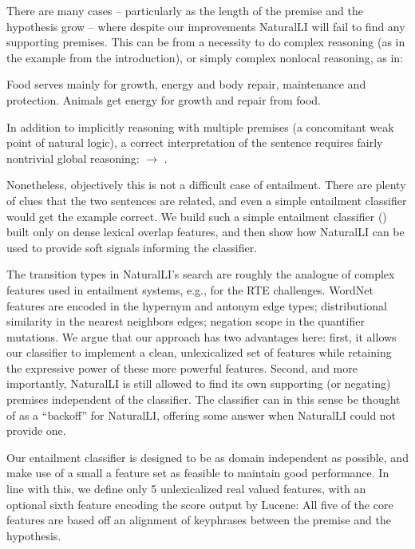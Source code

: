There are many cases -- particularly as the length of the premise and the hypothesis grow --
  where despite our improvements NaturalLI will fail to find any supporting
  premises.
This can be from a necessity to do complex reasoning (as in the example from the 
  introduction), or simply complex nonlocal reasoning, as in:

\entailmentExample
{Food serves mainly for growth, energy and body repair, maintenance and protection.}
{Animals get energy for growth and repair from food.}

In addition to implicitly reasoning with multiple premises (a concomitant weak
  point of natural logic), a correct interpretation of the sentence requires
  fairly nontrivial global reasoning: 
  $\rightarrow$ .

Nonetheless, objectively this is not a difficult case of entailment.
There are plenty of clues that the two sentences are related, and even a simple
  entailment classifier would get the example correct.
We build such a simple entailment classifier () built only
  on dense lexical overlap features, and
  then show how NaturalLI can be used to provide soft signals informing the classifier.

The transition types in NaturalLI's search are roughly the analogue of complex features
  used in entailment systems, e.g., for the RTE challenges.
WordNet features are encoded in the hypernym and antonym edge types; distributional
  similarity in the nearest neighbors edges; negation scope in the quantifier
  mutations.
We argue that our approach has two advantages here: 
  first, it allows our classifier to implement a clean, unlexicalized set of
  features while retaining the expressive power of these more powerful features.
Second, and more importantly, NaturalLI is still allowed to find its own supporting
  (or negating) premises independent of the classifier.
The classifier can in this sense be thought of as a ``backoff'' for NaturalLI,
  offering some answer when NaturalLI could not provide one.


%
%
Our entailment classifier is designed to be as domain independent as possible,
  and make use of a small a feature set as feasible to maintain good performance.
In line with this, we define only 5 unlexicalized real valued features, with an 
  optional sixth feature encoding the score output by Lucene:
All five of the core features are based off an alignment of keyphrases between the
  premise and the hypothesis.

